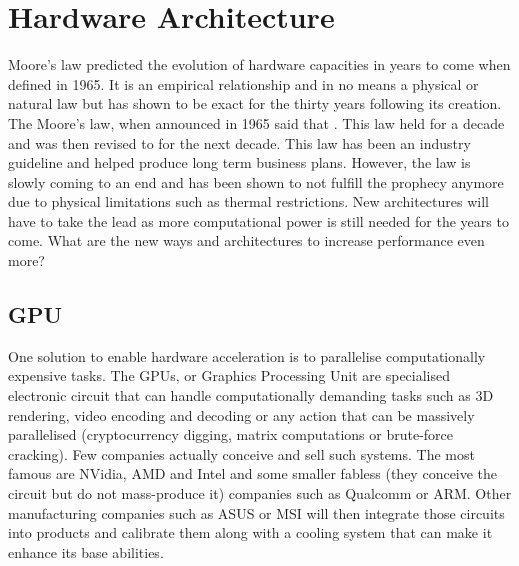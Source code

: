 
\section{Hardware Architecture}

Moore's law \cite{Moore2006} predicted the evolution of hardware capacities in years to come when defined in 1965. It is an empirical relationship and in no means a physical or natural law but has shown to be exact for the thirty years following its creation. The Moore's law, when announced in 1965 said that . This law held for a decade and was then revised to  for the next decade. This law has been an industry guideline and helped produce long term business plans. However, the law is slowly coming to an end and has been shown to not fulfill the prophecy anymore due to physical limitations such as thermal restrictions. New architectures will have to take the lead as more computational power is still needed for the years to come. What are the new ways and architectures to increase performance even more?


\subsection{GPU}

One solution to enable hardware acceleration is to parallelise computationally expensive tasks. The GPUs, or Graphics Processing Unit are specialised electronic circuit that can handle computationally demanding tasks such as 3D rendering, video encoding and decoding or any action that can be massively parallelised (cryptocurrency digging, matrix computations or brute-force cracking). Few companies actually conceive and sell such systems. The most famous are NVidia, AMD and Intel and some smaller fabless (they conceive the circuit but do not mass-produce it) companies such as Qualcomm or ARM. Other manufacturing companies such as ASUS or MSI will then integrate those circuits into products and calibrate them along with a cooling system that can make it enhance its base abilities.

